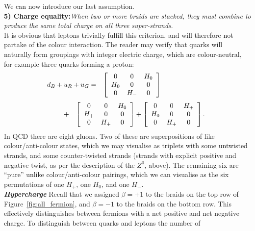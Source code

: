 \documentclass[twocolumn,showpacs,preprintnumbers,amsmath,amssymb]{revtex4}
\newcommand{\beqa}{\begin{eqnarray}}
\newcommand{\eeqa}{\end{eqnarray}}
\begin{document}
We can now introduce our last assumption.\\
{\bf 5) Charge equality:}{\em When two or more braids are stacked, 
they must combine to produce the same total charge on all 
three super-strands}.\\
It is obvious that leptons trivially fulfill this criterion, and will 
therefore not partake of the colour interaction. The reader may verify that 
quarks will naturally form groupings with integer electric charge, which are 
colour-neutral, for example three quarks forming a proton:
\begin{eqnarray*} 
d_B+u_R+u_G & =  &  \left[\begin{array}{ccc}
   0  &  0  & H_0   \\
  H_0 &  0  & 0   \\
   0  & H_- & 0  
      \end{array}\right] \hspace{24mm}\\
\end{eqnarray*}
\vspace{-9mm}
\beqa
\hspace{7mm} & + & \left[\begin{array}{ccc}
                               0   &  0  & H_0   \\
			       H_+ &  0  & 0   \\
			       0   & H_+ & 0 
                               \end{array}\right] +
 \left[\begin{array}{ccc}
   0  &  0  & H_+   \\
  H_0 &  0  & 0   \\
   0  & H_+ & 0 
      \end{array}\right].
\eeqa
In QCD there are eight gluons. Two of these are superpositions of like colour/anti-colour states, which we 
may visualise as triplets with some untwisted strands, and some counter-twisted strands
(strands with explicit positive and negative twist, as per the description of the 
$Z^0$, above). The remaining six are ``pure'' unlike colour/anti-colour pairings, which 
we can visualise as the six permutations of one $H_+$, one $H_0$, and one $H_-$.\\     
{\bf{\em Hypercharge}}
Recall that we assigned $\beta=+1$ to the braids on the top row of 
Figure~\ref{fig:all_fermion}, and $\beta=-1$ to the braids 
on the bottom row. This effectively distinguishes between fermions with a net positive 
and net negative charge. To distinguish between quarks and leptons the number of 
\end{document}
